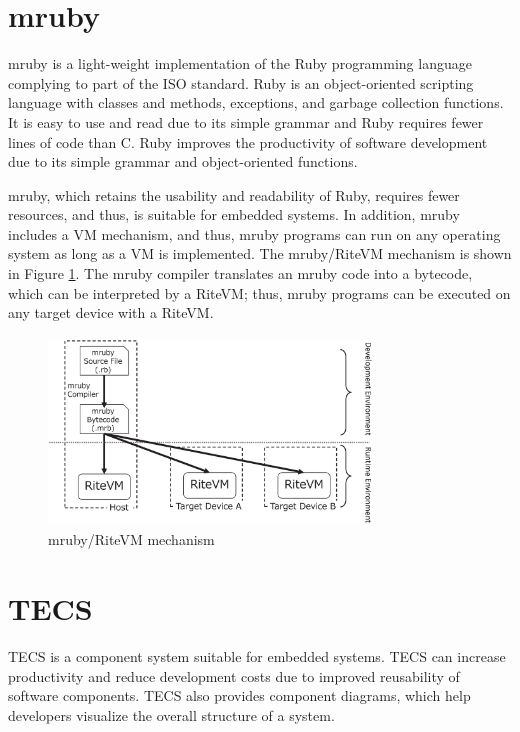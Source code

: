\documentclass[conference]{IEEEtran/IEEEtran/IEEEtran}
\begin{document}
\clearpage
\appendices
\section{mruby}
\label{apn:mruby}
mruby is a light-weight implementation of the Ruby programming language complying to part of the ISO standard.
Ruby is an object-oriented scripting language with classes and methods, exceptions, and garbage collection functions.
It is easy to use and read due to its simple grammar and Ruby requires fewer lines of code than C.
Ruby improves the productivity of software development due to its simple grammar and object-oriented functions.

mruby, which retains the usability and readability of Ruby, requires fewer resources, and thus, is suitable for embedded systems.
In addition, mruby includes a VM mechanism, and thus, mruby programs can run on any operating system as long as a VM is implemented.
The mruby/RiteVM mechanism is shown in Figure \ref{fig:mruby}.
The mruby compiler translates an mruby code into a bytecode, which can be interpreted by a RiteVM; thus, mruby programs can be executed on any target device with a RiteVM.
\begin{figure}[b]
    \centering
    \includegraphics[height=5.0cm,width=8.6cm,clip]{figure/mruby.eps}
    \vspace{-3mm}
    \caption{mruby/RiteVM mechanism}
    \vspace{-3mm}
    \label{fig:mruby}
\end{figure}

\section{TECS}
\label{apn:TECS}
TECS is a component system suitable for embedded systems.
TECS can increase productivity and reduce development costs due to improved reusability of software components.
TECS also provides component diagrams, which help developers visualize the overall structure of a system.
\end{document}
